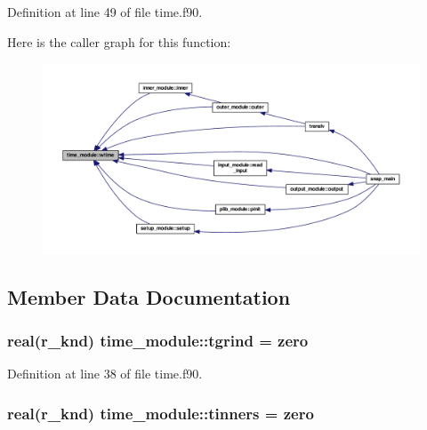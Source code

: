 Definition at line 49 of file time.\-f90.



Here is the caller graph for this function\-:\nopagebreak
\begin{figure}[H]
\begin{center}
\leavevmode
\includegraphics[width=350pt]{classtime__module_ad86f74c6ac28ecc6b163c6f777732f28_icgraph}
\end{center}
\end{figure}




\subsection{Member Data Documentation}
\hypertarget{classtime__module_a83421671217058a30dcccb2ea5b80cc6}{
\subsubsection[{tgrind}]{\setlength{\rightskip}{0pt plus 5cm}real(r\-\_\-knd) time\-\_\-module\-::tgrind = zero}}\label{classtime__module_a83421671217058a30dcccb2ea5b80cc6}


Definition at line 38 of file time.\-f90.

\hypertarget{classtime__module_a034b038776e4e01f89f2eee00a20f968}{
\subsubsection[{tinners}]{\setlength{\rightskip}{0pt plus 5cm}real(r\-\_\-knd) time\-\_\-module\-::tinners = zero}}\label{classtime__module_a034b038776e4e01f89f2eee00a20f968}


